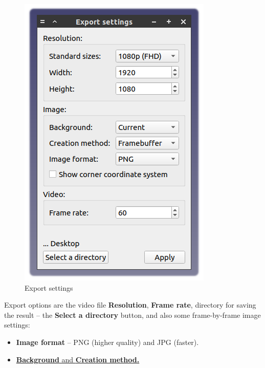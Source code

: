 \documentclass[a4paper,12pt]{article}
\begin{document}
\pagebreak




\begin{figure}[htp]
	\centering
	\includegraphics[scale=1]{img/exploded_es.png}
	\caption{Export settings}
	\label{sec:exploded_es}
\end{figure}

Export options are the video file \textbf{Resolution}, \textbf{Frame rate}, directory for saving the result -- the \textbf{Select a directory} button, and also some frame-by-frame image settings:

\begin{itemize}
	\item \textbf{Image format} -- PNG (higher quality) and JPG (faster).
	\item \href{https://wiki.freecad.org/Std_ViewScreenShot}{\textbf{Background} and \textbf{Creation method.}}
\end{itemize}
\end{document}
